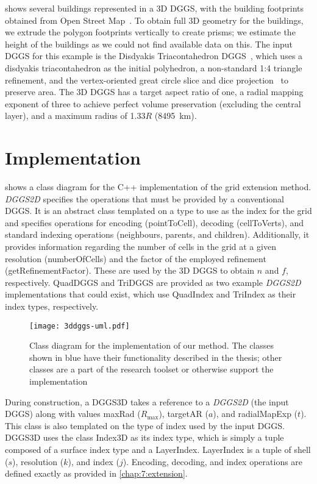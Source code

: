  shows several buildings represented in a 3D DGGS, with the building footprints obtained from Open Street Map~\cite{osm}.
To obtain full 3D geometry for the buildings, we extrude the polygon footprints vertically to create prisms; we estimate the height of the buildings as we could not find available data on this.
The input DGGS for this example is the Disdyakis Triacontahedron DGGS~\cite{hall2020disdyakis}, which uses a disdyakis triacontahedron as the initial polyhedron, a non-standard 1:4 triangle refinement, and the vertex-oriented great circle slice and dice projection~\cite{van2006slice} to preserve area.
The 3D DGGS has a target aspect ratio of one, a radial mapping exponent of three to achieve perfect volume preservation (excluding the central layer), and a maximum radius of 1.33$R$ (8495~km).


\section{Implementation} \label{chap:8:impl}
 shows a class diagram for the C++ implementation of the grid extension method.
\textit{DGGS2D} specifies the operations that must be provided by a conventional DGGS.
It is an abstract class templated on a type to use as the index for the grid and specifies operations for encoding (pointToCell), decoding (cellToVerts), and standard indexing operations (neighbours, parents, and children).
Additionally, it provides information regarding the number of cells in the grid at a given resolution (numberOfCells) and the factor of the employed refinement (getRefinementFactor).
These are used by the 3D DGGS to obtain $n$ and $f$, respectively. QuadDGGS and TriDGGS are provided as two example \textit{DGGS2D} implementations that could exist, which use QuadIndex and TriIndex as their index types, respectively.


\begin{figure}[ht!]
	\centering
	\texttt{[image: 3ddggs-uml.pdf]}
	\caption[Class diagram of the grid extension implementation]{
		Class diagram for the implementation of our method. The classes shown in blue have their functionality described in the thesis; other classes are a part of the research toolset or otherwise support the implementation
	}
	\label{fig:uml}
\end{figure}


During construction, a DGGS3D takes a reference to a \textit{DGGS2D} (the input DGGS) along with values maxRad ($R_\mathrm{max}$), targetAR ($a$), and radialMapExp ($t$).
This class is also templated on the type of index used by the input DGGS. DGGS3D uses the class Index3D as its index type, which is simply a tuple composed of a surface index type and a LayerIndex.
LayerIndex is a tuple of shell ($s$), resolution ($k$), and index ($j$).
Encoding, decoding, and index operations are defined exactly as provided in \cref{chap:7:extension}.



